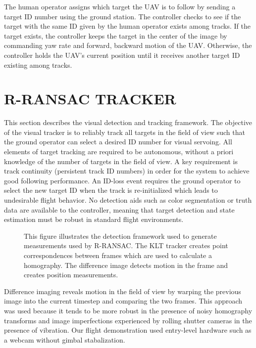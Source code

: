 \documentclass[letterpaper, 10 pt, conference]{ieeeconf}  %
\begin{document}
The human operator assigns which target the UAV is to follow by sending a target ID number using the ground station. The controller checks to see if the target with the same ID given by the human operator exists among tracks. If the target exists, the controller keeps the target in the center of the image by commanding yaw rate and forward, backward motion of the UAV. Otherwise, the controller holds the UAV's current position until it receives another target ID existing among tracks. 


\section{R-RANSAC TRACKER}


This section describes the visual detection and tracking framework. The objective of the visual tracker is to reliably track all targets in the field of view such that the ground operator can select a desired ID number for visual servoing. All elements of target tracking are required to be autonomous, without a priori knowledge of the number of targets in the field of view. A key requirement is track continuity (persistent track ID numbers) in order for the system to achieve good following performance. An ID-loss event requires the ground operator to select the new target ID when the track is re-initialized which leads to undesirable flight behavior. No detection aids such as color segmentation or truth data are available to the controller, meaning that target detection and state estimation must be robust in standard flight environments.

\begin{figure}[thpb]
	\centering
	\caption{This figure illustrates the detection framework used to generate measurements used by R-RANSAC. The KLT tracker creates point correspondences between frames which are used to calculate a homography. The difference image detects motion in the frame and creates position measurements.}
	\label{visual_tracking}
\end{figure}

Difference imaging reveals motion in the field of view by warping the previous image into the current timestep and comparing the two frames. This approach was used because it tends to be more robust in the presence of noisy homography transforms and image imperfections experienced by rolling shutter cameras in the presence of vibration. Our flight demonstration used entry-level hardware such as a webcam without gimbal stabalization.
\end{document}
